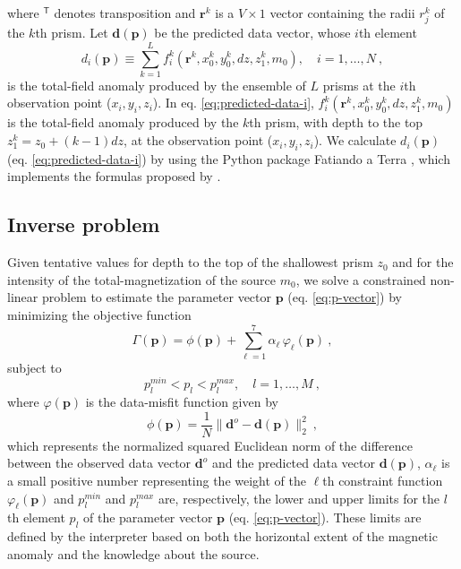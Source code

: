 where $^{\mathsf{T}}$ denotes transposition and $\mathbf{r}^{k}$ is a $V \times 1$ vector containing the radii $r^{k}_{j}$ 
of the $k$th prism.
Let $\mathbf{d} (\mathbf{p})$ be the predicted data vector, whose $i$th element 
\begin{equation}
d_{i} (\mathbf{p}) \equiv \sum\limits_{k=1}^{L} f_{i}^{k}(\mathbf{r}^{k}, x_{0}^{k}, y_{0}^{k}, dz, z_{1}^{k}, m_{0}), \quad i = 1, \dots, N \: ,
\label{eq:predicted-data-i}
\end{equation}
is the total-field anomaly produced by the ensemble of $L$ prisms at the $i$th observation point ($x_{i}, y_{i}, z_{i}$). 
In eq. \ref{eq:predicted-data-i}, $f_{i}^{k}(\mathbf{r}^{k}, x_{0}^{k}, y_{0}^{k}, dz, z_{1}^{k}, m_{0})$ is the total-field anomaly 
produced by the $k$th prism, with depth to the top $z_{1}^{k} = z_{0} + (k-1)dz$, at the observation point ($x_{i}, y_{i}, z_{i}$).
We calculate $d_{i} (\mathbf{p})$ (eq. \ref{eq:predicted-data-i}) by using the Python package Fatiando a Terra \citep{uieda-etal2013}, 
which implements the formulas proposed by \cite{plouff1976}.

\subsection{Inverse problem}

Given tentative values for depth to the top of the shallowest prism $z_{0}$ and for the intensity of the total-magnetization of the source
$m_{0}$, we solve a constrained non-linear problem to estimate the parameter vector $\mathbf{p}$ (eq. \ref{eq:p-vector}) by minimizing the 
objective function
\begin{equation}
\Gamma (\mathbf{p}) = \phi (\mathbf{p}) + \sum\limits^{7}_{\ell =1} \alpha_{\ell} \, \varphi_{\ell}(\mathbf{p}) \: ,
\label{eq:gamma}
\end{equation}
subject to
\begin{equation}
p_{l}^{min} < p_{l} < p_{l}^{max}, \quad l = 1, \dots, M \: ,
\label{eq:inequality-constraint}
\end{equation}
where $\varphi (\mathbf{p})$ is the data-misfit function given by
\begin{equation}\label{eq:misfit}
\phi (\mathbf{p}) = \frac{1}{N} \| \mathbf{d}^{o} - \mathbf{d}(\mathbf{p}) \|_{2}^{2} \: ,
\end{equation}
which represents the normalized squared Euclidean norm of the difference between the observed data vector $\mathbf{d}^{o}$ and 
the predicted data vector $\mathbf{d}(\mathbf{p})$, $\alpha_{\ell}$ is a small positive number representing the weight of the 
$\ell$th constraint function $\varphi_{\ell}(\mathbf{p})$ and $p_{l}^{min}$ and $p_{l}^{max}$ are, respectively, the lower and 
upper limits for the $l$th element $p_{l}$ of the parameter vector $\mathbf{p}$ (eq. \ref{eq:p-vector}). 
These limits are defined by the interpreter based on both the horizontal extent of the magnetic anomaly and the knowledge 
about the source.

